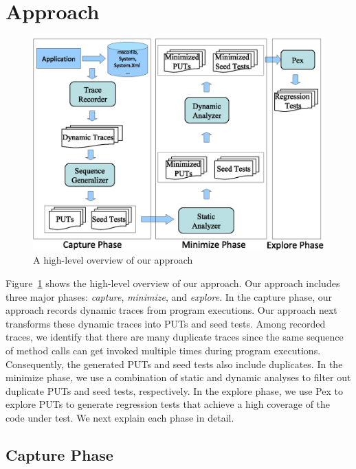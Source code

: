 \section{Approach}
\label{sec:approach}

\begin{figure}[t]
\centering
\includegraphics[scale=0.60,clip]{figs/approach1.eps}\vspace*{-2ex}
\caption{A high-level overview of our approach} \label{fig:overview}\vspace*{-3ex}
\end{figure}

Figure~\ref{fig:overview} shows the high-level overview of our approach. Our approach includes three major phases: \emph{capture}, \emph{minimize}, and \emph{explore}. In the
capture phase, our approach records dynamic traces from program executions. Our approach next transforms these dynamic traces into PUTs and seed tests. Among recorded traces, we identify that there are many duplicate traces since the same sequence of method calls can get invoked multiple times during program executions. Consequently,
the generated PUTs and seed tests also include duplicates. In the minimize phase, we use a combination of static and dynamic analyses to filter out duplicate PUTs and seed tests, respectively. In the explore phase, we use Pex to explore PUTs to generate regression tests that achieve a high coverage of the code under test. We next explain each phase in detail.

\subsection{Capture Phase}
\label{sec:capture}

